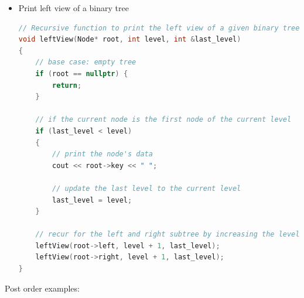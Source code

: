 \documentclass[a4paper,11pt,twoside]{book}
\begin{document}
\begin{itemize}
	
\item Print left view of a binary tree
\begin{lstlisting}[frame=single, language=c++]
// Recursive function to print the left view of a given binary tree
void leftView(Node* root, int level, int &last_level)
{
	// base case: empty tree
	if (root == nullptr) {
		return;
	}
	
	// if the current node is the first node of the current level
	if (last_level < level)
	{
		// print the node's data
		cout << root->key << " ";
		
		// update the last level to the current level
		last_level = level;
	}
	
	// recur for the left and right subtree by increasing the level by 1
	leftView(root->left, level + 1, last_level);
	leftView(root->right, level + 1, last_level);
}
\end{lstlisting}


\end{itemize}

\par Post order examples:
\end{document}
